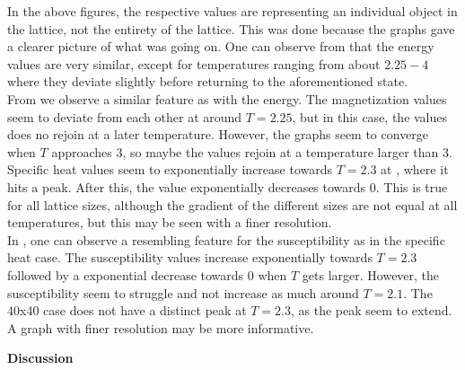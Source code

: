 \documentclass[10pt,a4paper]{article}
\begin{document}
\noindent In the above figures, the respective values are representing an individual object in the lattice, not the entirety of the lattice. This was done because the graphs gave a clearer picture of what was going on. One can observe from  that the energy values are very similar, except for temperatures ranging from about $2.25 - 4$ where they deviate slightly before returning to the aforementioned state.
\\
From  we observe a similar feature as with the energy. The magnetization values seem to deviate from each other at around $T = 2.25$, but in this case, the values does no rejoin at a later temperature. However, the graphs seem to converge when $T$ approaches $3$, so maybe the values rejoin at a temperature larger than $3$.
\\
Specific heat values seem to exponentially increase towards $T = 2.3$ at , where it hits a peak. After this, the value exponentially decreases towards $0$. This is true for all lattice sizes, although the gradient of the different sizes are not equal at all temperatures, but this may be seen with a finer resolution.
\\
In , one can observe a resembling feature for the susceptibility as in the specific heat case. The susceptibility values increase exponentially towards $T = 2.3$ followed by a exponential decrease towards $0$ when $T$ gets larger. However, the susceptibility seem to struggle and not increase as much around $T = 2.1$. The 40x40 case does not have a distinct peak at $T = 2.3$, as the peak seem to extend. A graph with finer resolution may be more informative. 

\newpage

\begin{center}
{\LARGE\bf Discussion}
\end{center}
\end{document}
